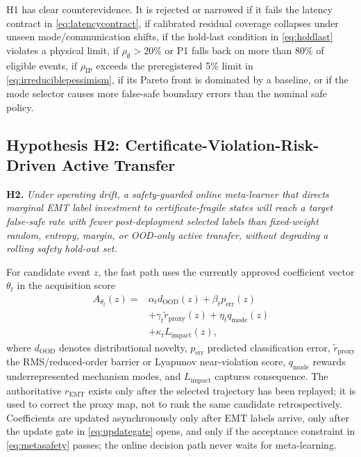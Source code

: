 \documentclass[conference]{IEEEtran}
\begin{document}
H1 has clear counterevidence. It is rejected or narrowed if it fails the latency contract in \eqref{eq:latencycontract}, if calibrated residual coverage collapses under unseen mode/communication shifts, if the hold-last condition in \eqref{eq:holdlast} violates a physical limit, if $\rho_{\emptyset}>20\%$ or P1 falls back on more than 80\% of eligible events, if $\rho_{\mathrm{IP}}$ exceeds the preregistered 5\% limit in \eqref{eq:irreduciblepessimism}, if its Pareto front is dominated by a baseline, or if the mode selector causes more false-safe boundary errors than the nominal safe policy.

\subsection{Hypothesis H2: Certificate-Violation-Risk-Driven Active Transfer}

\textbf{H2.} \emph{Under operating drift, a safety-guarded online meta-learner that directs marginal EMT label investment to certificate-fragile states will reach a target false-safe rate with fewer post-deployment selected labels than fixed-weight random, entropy, margin, or OOD-only active transfer, without degrading a rolling safety hold-out set.}

For candidate event $z$, the fast path uses the currently approved coefficient vector $\theta_t$ in the acquisition score
\begin{equation}
\begin{aligned}
A_{\theta_t}(z)={}&\alpha_t d_{\mathrm{OOD}}(z)+\beta_t p_{\mathrm{err}}(z)\\
&+\gamma_t\widetilde r_{\mathrm{proxy}}(z)+\eta_t q_{\mathrm{mode}}(z)\\
&+\kappa_tL_{\mathrm{impact}}(z),
\end{aligned}
  \label{eq:acq}
\end{equation}
where $d_{\mathrm{OOD}}$ denotes distributional novelty, $p_{\mathrm{err}}$ predicted classification error, $\widetilde r_{\mathrm{proxy}}$ the RMS/reduced-order barrier or Lyapunov near-violation score, $q_{\mathrm{mode}}$ rewards underrepresented mechanism modes, and $L_{\mathrm{impact}}$ captures consequence. The authoritative $r_{\mathrm{EMT}}$ exists only after the selected trajectory has been replayed; it is used to correct the proxy map, not to rank the same candidate retrospectively. Coefficients are updated asynchronously only after EMT labels arrive, only after the update gate in \eqref{eq:updategate} opens, and only if the acceptance constraint in \eqref{eq:metasafety} passes; the online decision path never waits for meta-learning.
\end{document}
